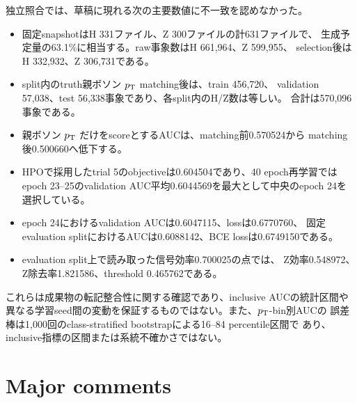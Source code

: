 \documentclass[xelatex,ja=standard,a4paper,10pt]{bxjsarticle}
\begin{document}
独立照合では、草稿に現れる次の主要数値に不一致を認めなかった。

\begin{itemize}
  \item 固定snapshotはH 331ファイル、Z 300ファイルの計631ファイルで、
    生成予定量の63.1\%に相当する。raw事象数はH 661,964、Z 599,955、
    selection後はH 332,932、Z 306,731である。
  \item split内のtruth親ボソン \(p_{\mathrm{T}}\) matching後は、train 456,720、
    validation 57,038、test 56,338事象であり、各split内のH/Z数は等しい。
    合計は570,096事象である。
  \item 親ボソン \(p_{\mathrm{T}}\) だけをscoreとするAUCは、matching前0.570524から
    matching後0.500660へ低下する。
  \item HPOで採用したtrial 5のobjectiveは0.604504であり、40 epoch再学習では
    epoch 23--25のvalidation AUC平均0.6044569を最大として中央のepoch 24を
    選択している。
  \item epoch 24におけるvalidation AUCは0.6047115、lossは0.6770760、
    固定evaluation splitにおけるAUCは0.6088142、BCE lossは0.6749150である。
  \item evaluation split上で読み取った信号効率0.700025の点では、
    Z効率0.548972、Z除去率1.821586、threshold 0.465762である。
\end{itemize}

これらは成果物の転記整合性に関する確認であり、inclusive AUCの統計区間や
異なる学習seed間の変動を保証するものではない。また、\(p_{\mathrm{T}}\)-bin別AUCの
誤差棒は1,000回のclass-stratified bootstrapによる16--84 percentile区間で
あり、inclusive指標の区間または系統不確かさではない。

\section{Major comments}
\end{document}
